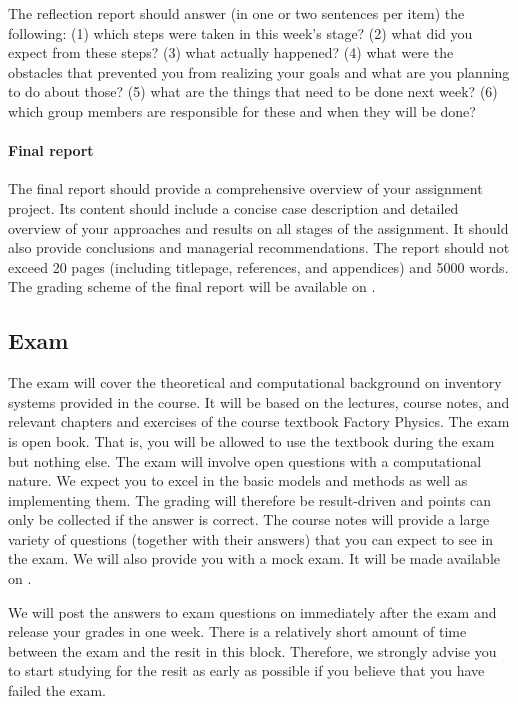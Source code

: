 \documentclass{article}
\begin{document}
The reflection report should answer (in one or two sentences per item) the following: (1) which steps were taken in this week's stage? (2) what did you expect from these steps? (3) what actually happened? (4) what were the obstacles that prevented you from realizing your goals and what are you planning to do about those? (5) what are the things that need to be done next week? (6) which group members are responsible for these and when they will be done? 

\paragraph{Final report}
\label{par:final}

The final report should provide a comprehensive overview of your assignment project. Its content should include a concise case description and detailed overview of your approaches and results on all stages of the assignment. It should also provide conclusions and managerial recommendations. The report should not exceed 20 pages (including titlepage, references, and appendices) and 5000 words. The grading scheme of the final report will be available on \nestor.

\subsection{Exam}
\label{sec:exam}

The exam will cover the theoretical and computational background on inventory systems provided in the course. It will be based on the lectures, course notes, and relevant chapters and exercises of the course textbook Factory Physics. The exam is open book. That is, you will be allowed to use the textbook during the exam but nothing else. The exam will involve open questions with a computational nature. We expect you to excel in the basic models and methods as well as implementing them. The grading will therefore be result-driven and points can only be collected if the answer is correct. The course notes will provide a large variety of questions (together with their answers) that you can expect to see in the exam. We will also provide you with a mock exam. It will be made available on \nestor. 

We will post the answers to exam questions on \nestor immediately after the exam and release your grades in one week. There is a relatively short amount of time between the exam and the resit in this block. Therefore, we strongly advise you to start studying for the resit as early as possible if you believe that you have failed the exam.
\end{document}
